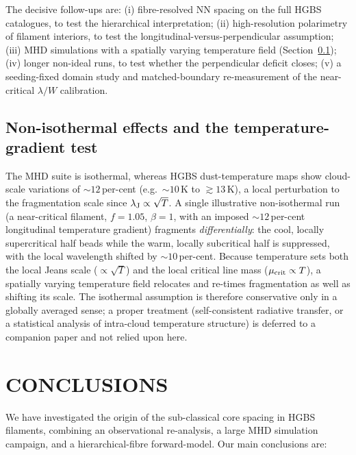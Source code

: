 \documentclass[usenatbib,twoside,twocolumn]{mnras}
\begin{document}
The decisive follow-ups are: (i) fibre-resolved NN spacing on the full HGBS catalogues, to test the hierarchical interpretation; (ii) high-resolution polarimetry of filament interiors, to test the longitudinal-versus-perpendicular assumption; (iii) MHD simulations with a spatially varying temperature field (Section~\ref{sec:mt_variation}); (iv) longer non-ideal runs, to test whether the perpendicular deficit closes; (v) a seeding-fixed domain study and matched-boundary re-measurement of the near-critical $\lambda/W$ calibration.


\subsection{Non-isothermal effects and the temperature-gradient test}
\label{sec:mt_variation}

The MHD suite is isothermal, whereas HGBS dust-temperature maps show cloud-scale variations of $\sim12$\,per-cent (e.g.\ $\sim10$\,K to $\gtrsim13$\,K), a local perturbation to the fragmentation scale since $\lambda_{\rm J}\propto\sqrt{T}$. A single illustrative non-isothermal run (a near-critical filament, $f=1.05$, $\beta=1$, with an imposed $\sim12$\,per-cent longitudinal temperature gradient) fragments \emph{differentially}: the cool, locally supercritical half beads while the warm, locally subcritical half is suppressed, with the local wavelength shifted by $\sim10$\,per-cent. Because temperature sets both the local Jeans scale ($\propto\sqrt{T}$) and the local critical line mass ($\mu_{\rm crit}\propto T$), a spatially varying temperature field relocates and re-times fragmentation as well as shifting its scale. The isothermal assumption is therefore conservative only in a globally averaged sense; a proper treatment (self-consistent radiative transfer, or a statistical analysis of intra-cloud temperature structure) is deferred to a companion paper and not relied upon here.


\section{CONCLUSIONS}

We have investigated the origin of the sub-classical core spacing in HGBS filaments, combining an observational re-analysis, a large MHD simulation campaign, and a hierarchical-fibre forward-model. Our main conclusions are:
\end{document}
